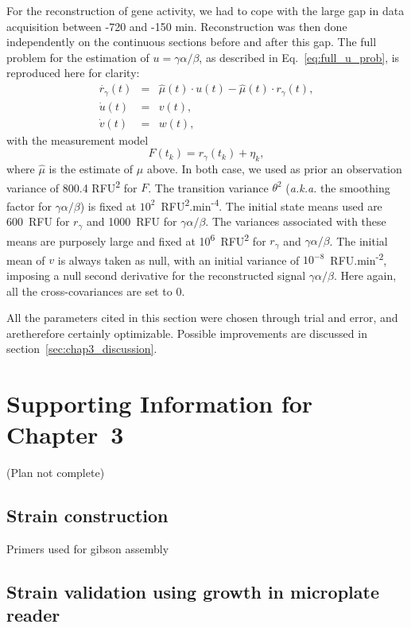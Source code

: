For the reconstruction of gene activity, we had to cope with the large
gap in data acquisition between -720 and -150 min. Reconstruction
was then done independently on the continuous sections before and
after this gap. The full problem for the estimation of $u=\gamma\alpha/\beta$,
as described in Eq.~\ref{eq:full_u_prob}, is reproduced here for
clarity: 
\begin{eqnarray*}
\dot{r_{\gamma}}(t) & = & \hat{\mu}(t)\cdot u(t)-\hat{\mu}(t)\cdot r_{\gamma}(t),\\
\dot{u}(t) & = & v(t),\\
\dot{v}(t) & = & w(t),
\end{eqnarray*}
with the measurement model 
\[
F(t_{k})=r_{\gamma}(t_{k})+\eta_{k},
\]
where $\hat{\mu}$ is the estimate of $\mu$ above. In both case,
we used as prior an observation variance of 800.4 RFU\textsuperscript{2}
for $F$. The transition variance $\theta^{2}$ (\textit{a.k.a.} the
smoothing factor for $\gamma\alpha/\beta$) is fixed at $10^{2}$~RFU\textsuperscript{2}.min\textsuperscript{-4}.
The initial state means used are 600~RFU for $r_{\gamma}$ and 1000~RFU
for $\gamma\alpha/\beta$. The variances associated with these means
are purposely large and fixed at 10\textsuperscript{6}~RFU\textsuperscript{2}
for $r_{\gamma}$ and $\gamma\alpha/\beta$. The initial mean of $v$
is always taken as null, with an initial variance of $10^{-8}$~RFU.min\textsuperscript{-2},
imposing a null second derivative for the reconstructed signal $\gamma\alpha/\beta$.
Here again, all the cross-covariances are set to 0.

All the parameters cited in this section were chosen through trial
and error, and aretherefore certainly optimizable. Possible improvements
are discussed in section~\ref{sec:chap3_discussion}.

\section{Supporting Information for Chapter~3}

(Plan not complete)

\subsection{Strain construction}

Primers used for gibson assembly

\subsection{Strain validation using growth in microplate reader}


